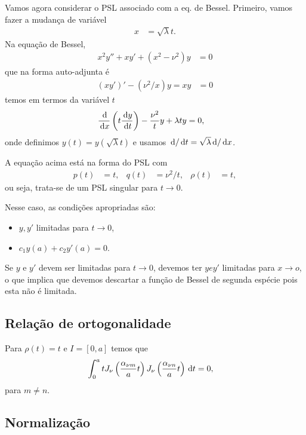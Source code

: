 Vamos agora considerar o PSL associado com a eq. de Bessel. Primeiro, vamos fazer a mudan\c{c}a de vari\'{a}vel
\begin{align*}
    x &= \sqrt{\lambda} t.
\end{align*}
Na equa\c{c}\~{a}o de Bessel,
\begin{align*}
    x^2 y'' + x y' + \left( x^2 - \nu^2 \right) y &= 0
\end{align*}
que na forma auto-adjunta \'{e}
\begin{align*}
    \left( x y' \right)' - \left( \nu^2 / x \right) y = x y &= 0
\end{align*}
temos em termos da vari\'{a}vel $t$
\begin{align*}
    \frac{\, \mathrm{d}}{\, \mathrm{d}x}\left( t \frac{\, \mathrm{d}y}{\, \mathrm{d}t} \right) - \frac{\nu^2}{t} y + \lambda t y &= 0,
\end{align*}
onde definimos $y(t) = y(\sqrt{\lambda} t)$ e usamos $\, \mathrm{d} / \, \mathrm{d}t = \sqrt{\lambda} \, \mathrm{d} / \, \mathrm{d}x$.

A equa\c{c}\~{a}o acima est\'{a} na forma do PSL com
\begin{align*}
    p(t) &= t, & q(t) &= \nu^2 / t, & \rho(t) &= t,
\end{align*}
ou seja, trata-se de um PSL singular para $t \to 0$.

Nesse caso, as condi\c{c}\~{o}es apropriadas s\~{a}o:
\begin{itemize}
    \item $y, y'$ limitadas para $t \to 0$,
    \item $c_1 y(a) + c_2 y'(a) = 0$.
\end{itemize}

\begin{obs}
    Se $y$ e $y'$ devem ser limitadas para $t \to 0$, devemos ter $y e y'$ limitadas para $x \to o$, o que implica que devemos descartar a fun\c{c}\~{a}o de Bessel de segunda esp\'{e}cie pois esta n\~{a}o \'{e} limitada.
\end{obs}


\subsection{Rela\c{c}\~{a}o de ortogonalidade}
Para $\rho(t) = t$ e $I = [0,a]$ temos que
\begin{align*}
    \int_0^a t J_\nu\left( \frac{\alpha_{\nu m}}{a} t \right) J_\nu\left( \frac{\alpha_{\nu n}}{a} t \right) \, \mathrm{d}t &= 0,
\end{align*}
para $m \neq n$.

\subsection{Normaliza\c{c}\~{a}o}
